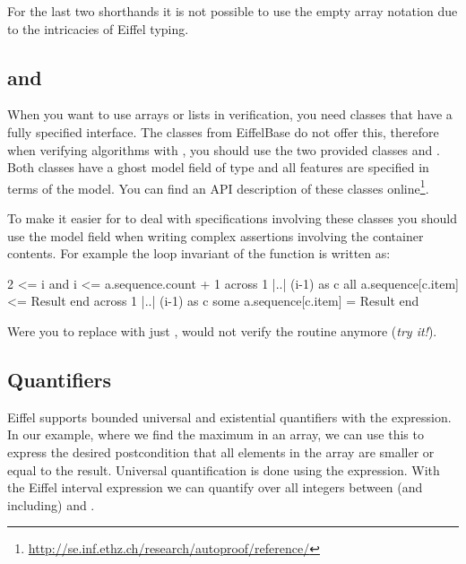 For the last two shorthands it is not possible to use the empty array notation \e{<< >>} due to the intricacies of Eiffel typing.

\subsection{ and }

When you want to use arrays or lists in verification, you need classes that have a fully specified interface. The classes from EiffelBase do not offer this, therefore when verifying algorithms with \AutoProof, you should use the two provided classes  and . Both classes have a ghost model field  of type  and all features are specified in terms of the model. You can find an API description of these classes online\footnote{\url{http://se.inf.ethz.ch/research/autoproof/reference/}}.

To make it easier for \AutoProof to deal with specifications involving these classes you should use the  model field when writing complex assertions involving the container contents. For example the loop invariant of the  function is written as:
\begin{erunning}
2 <= i and i <= a.sequence.count + 1
across 1 |..| (i-1) as c all a.sequence[c.item] <= Result end
across 1 |..| (i-1) as c some a.sequence[c.item] = Result end
\end{erunning}
Were you to replace  with just , \AutoProof would not verify the routine anymore (\emph{try it!}).

\subsection{Quantifiers}

Eiffel supports bounded universal and existential quantifiers with the  expression. In our example, where we find the maximum in an array, we can use this to express the desired postcondition that all elements in the array are smaller or equal to the result. Universal quantification is done using the  expression. With the Eiffel interval expression  we can quantify over all integers between (and including)  and . 

